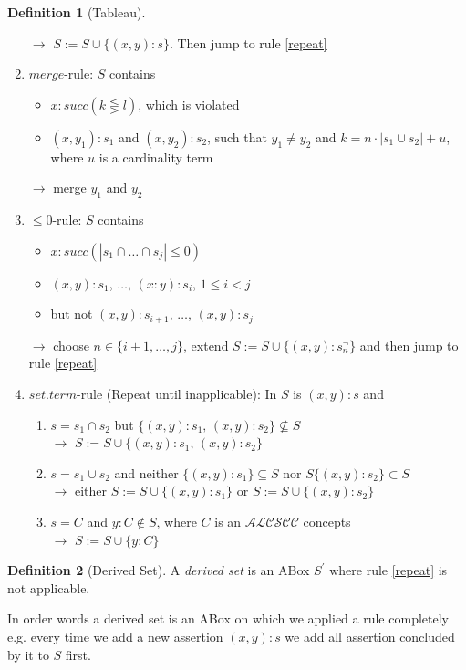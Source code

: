 \documentclass[a4paper,11pt]{scrartcl}
\theoremstyle{break}
\theoremstyle{definition}
\newtheorem{mydef}{Definition}
\begin{document}
\begin{mydef}[Tableau]
\begin{enumerate}
\begin{itemize}
\end{itemize}
$\rightarrow$ $S:=S\cup\{(x,y):s\}$. Then jump to rule \ref{repeat}
\item\label{exceeded}$merge$-rule: $S$ contains
\begin{itemize}
\item $x:succ(k\lesseqgtr l)$, which is violated
\item $(x,y_1):s_1$ and $(x,y_2):s_2$, such that $y_1\neq y_2$ and $k=n\cdot |s_1\cup s_2|+u$, where $u$ is a cardinality term
\end{itemize}
$\rightarrow$ merge $y_1$ and $y_2$ 
\item\label{s}$\leq 0$-rule: $S$ contains 
\begin{itemize}
\item $x:succ(|s_1\cap\dots\cap s_j|\leq 0)$
\item $(x,y):s_1$, $\dots$, $(x:y):s_i$, $1\leq i<j$
\item but not $(x,y):s_{i+1}$, $\dots$, $(x,y):s_j$
\end{itemize}
$\rightarrow$ choose $n\in\{i+1,\dots, j\}$, extend $S:=S\cup\{(x,y):s_n^\neg\}$ and then jump to rule \ref{repeat}
\item\label{repeat} $set.term$-rule (Repeat until inapplicable): In $S$ is $(x,y):s$ and
\begin{enumerate}
\item\label{setterm1} $s=s_1\cap s_2$ but $\{(x,y):s_1,\,(x,y):s_2\}\not\subseteq S$\\
$\rightarrow$ $S:=S\cup \{(x,y):s_1,\,(x,y):s_2\}$ 
\item\label{setterm2} $s=s_1\cup s_2$ and neither $\{(x,y):s_1\}\subseteq S$ nor $S\{(x,y):s_2\}\subset S$\\
$\rightarrow$ either $S:=S\cup \{(x,y):s_1\}$ or $S:=S\cup \{(x,y):s_2\}$ 
\item\label{setterm3} $s=C$ and $y:C\notin S$, where $C$ is an $\mathcal{ALCSCC}$ concepts\\
$\rightarrow$ $S:=S\cup\{y:C\}$
\end{enumerate}
\end{enumerate}
\end{mydef}
\begin{mydef}[Derived Set]
A \textit{derived set} is an ABox $S^\prime$ where rule \ref{repeat} is not applicable.
\end{mydef}
In order words a derived set is an ABox on which we applied a rule completely e.g. every time we add a new assertion $(x,y):s$ we add all assertion concluded by it to $S$ first.\\
\end{document}
